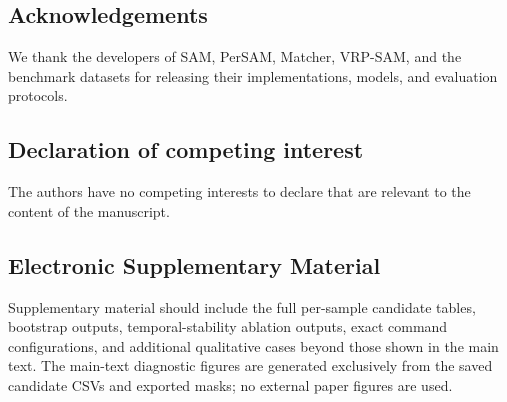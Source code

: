 \documentclass{CVM}
\begin{document}
\subsection*{Acknowledgements}

We thank the developers of SAM, PerSAM, Matcher, VRP-SAM, and the benchmark datasets for releasing their implementations, models, and evaluation protocols.

\subsection*{Declaration of competing interest}

The authors have no competing interests to declare that are relevant to the content of the manuscript.

\subsection*{Electronic Supplementary Material}

Supplementary material should include the full per-sample candidate tables, bootstrap outputs, temporal-stability ablation outputs, exact command configurations, and additional qualitative cases beyond those shown in the main text. The main-text diagnostic figures are generated exclusively from the saved candidate CSVs and exported masks; no external paper figures are used.
\end{document}
